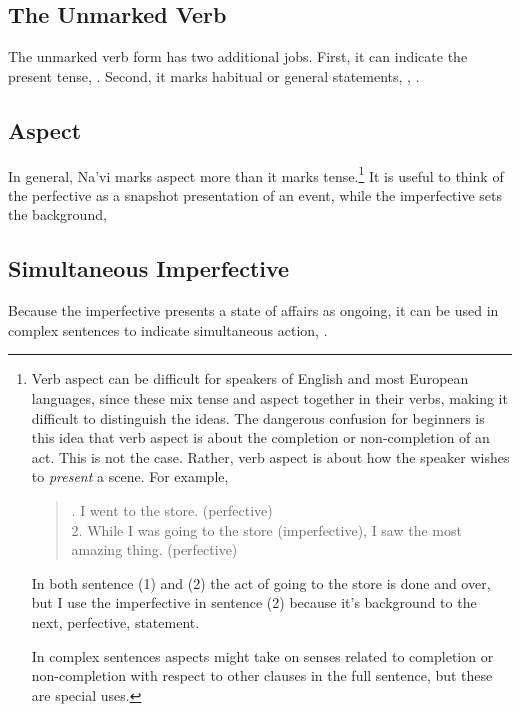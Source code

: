 \subsection{The Unmarked Verb} The unmarked verb form has two
additional jobs.  First, it can indicate the present tense,
 .  Second, it marks
habitual or general statements, 
,  .

\subsection{Aspect} In general, Na'vi marks aspect more than it marks
tense.\footnote{Verb aspect can be difficult for speakers of English
and most European languages, since these mix tense and aspect
together in their verbs, making it difficult to distinguish the
ideas.  The dangerous confusion for beginners is this idea that verb
aspect is about the completion or non-completion of an act.  This is
not the case.  Rather, verb aspect is about how the speaker wishes to
\textit{present} a scene.  For example,

\begin{quotation}
.  I went to the store.  (perfective)\\
2.  While I was going to the store (imperfective), I saw the most amazing thing. (perfective)
\end{quotation}
In both sentence (1) and (2) the act of going to the store is done
and over, but I use the imperfective in sentence (2) because
it's background to the next, perfective, statement.

In complex sentences aspects might take on senses related to
completion or non-completion with respect to other clauses in the full
sentence, but these are special uses.}  It is useful to think of the
perfective as a snapshot presentation of an event, while the
imperfective sets the background,  

\subsection{Simultaneous Imperfective} Because the imperfective
presents a state of affairs as on\-going, it can be used in complex
sentences to indicate simultaneous action,  .

